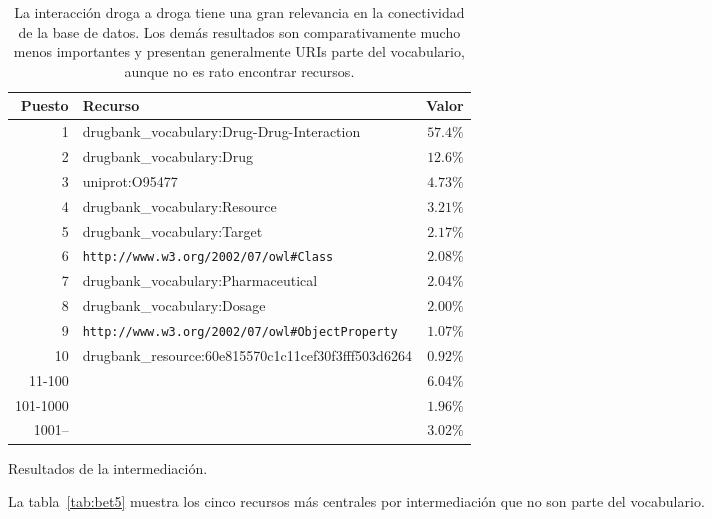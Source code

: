 \begin{table}[ht]
  \centering
  \begin{tabular}{|r|l|r|}\hline
    \bf{Puesto} & \bf{Recurso} & \bf{Valor} \\\hline
     1 & drugbank\_vocabulary:Drug-Drug-Interaction          & $57.4\%$ \\\hline
     2 & drugbank\_vocabulary:Drug                           & $12.6\%$ \\\hline
     3 & uniprot:O95477                                      & $4.73\%$ \\\hline
     4 & drugbank\_vocabulary:Resource                       & $3.21\%$ \\\hline
     5 & drugbank\_vocabulary:Target                         & $2.17\%$ \\\hline
     6 & \tt{http://www.w3.org/2002/07/owl\#Class}           & $2.08\%$ \\\hline
     7 & drugbank\_vocabulary:Pharmaceutical                 & $2.04\%$ \\\hline
     8 & drugbank\_vocabulary:Dosage                         & $2.00\%$ \\\hline
     9 & \tt{http://www.w3.org/2002/07/owl\#ObjectProperty}  & $1.07\%$ \\\hline
    10 & drugbank\_resource:60e815570c1c11cef30f3fff503d6264 & $0.92\%$ \\\hline
    11-100 		& & $6.04\%$ \\\hline
    101-1000  & & $1.96\%$ \\\hline
    1001--    & & $3.02\%$ \\\hline
  \end{tabular}
  \caption{Resultados de la intermediación.}\label{tab:betres}
  \vspace{-.2cm}
  \caption*{\small
    La interacción droga a droga tiene una gran relevancia en la  conectividad
    de la base de datos. Los demás resultados son comparativamente
    mucho menos importantes y presentan generalmente URIs parte del vocabulario,
    aunque no es rato encontrar recursos.
  }
\end{table}

La tabla~\ref{tab:bet5} muestra los cinco recursos más centrales por
intermediación que no son parte del vocabulario.

